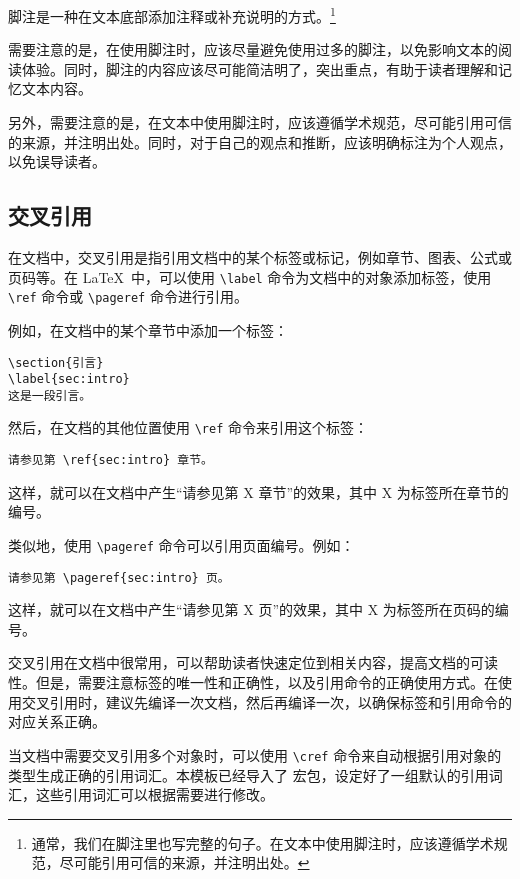脚注是一种在文本底部添加注释或补充说明的方式。\footnote{通常，我们在脚注里也写完整的句子。在文本中使用脚注时，应该遵循学术规范，尽可能引用可信的来源，并注明出处。}

需要注意的是，在使用脚注时，应该尽量避免使用过多的脚注，以免影响文本的阅读体验。同时，脚注的内容应该尽可能简洁明了，突出重点，有助于读者理解和记忆文本内容。

另外，需要注意的是，在文本中使用脚注时，应该遵循学术规范，尽可能引用可信的来源，并注明出处。同时，对于自己的观点和推断，应该明确标注为个人观点，以免误导读者。

\subsection{交叉引用}

在文档中，交叉引用是指引用文档中的某个标签或标记，例如章节、图表、公式或页码等。在 \LaTeX\ 中，可以使用 \verb|\label| 命令为文档中的对象添加标签，使用 \verb|\ref| 命令或 \verb|\pageref| 命令进行引用。

例如，在文档中的某个章节中添加一个标签：

\begin{Verbatim}
\section{引言}
\label{sec:intro}
这是一段引言。
\end{Verbatim}

然后，在文档的其他位置使用 \verb|\ref| 命令来引用这个标签：

\begin{Verbatim}
请参见第 \ref{sec:intro} 章节。
\end{Verbatim}

这样，就可以在文档中产生“请参见第 X 章节”的效果，其中 X 为标签所在章节的编号。

类似地，使用 \verb|\pageref| 命令可以引用页面编号。例如：

\begin{Verbatim}
请参见第 \pageref{sec:intro} 页。
\end{Verbatim}

这样，就可以在文档中产生“请参见第 X 页”的效果，其中 X 为标签所在页码的编号。

交叉引用在文档中很常用，可以帮助读者快速定位到相关内容，提高文档的可读性。但是，需要注意标签的唯一性和正确性，以及引用命令的正确使用方式。在使用交叉引用时，建议先编译一次文档，然后再编译一次，以确保标签和引用命令的对应关系正确。

当文档中需要交叉引用多个对象时，可以使用 \verb|\cref| 命令来自动根据引用对象的类型生成正确的引用词汇。本模板已经导入了  宏包，设定好了一组默认的引用词汇，这些引用词汇可以根据需要进行修改。

